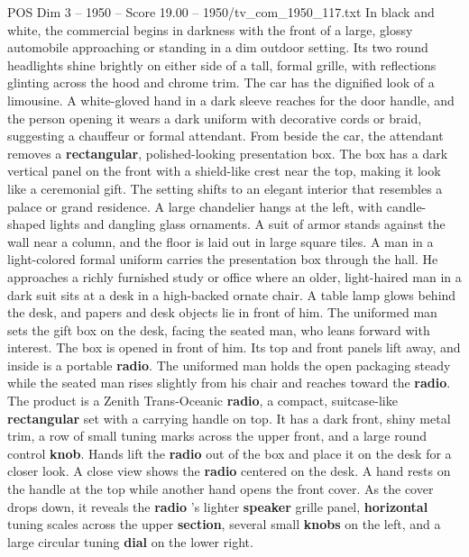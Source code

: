 \begin{textsample}{POS Dim 3 – 1950 – Score 19.00 – 1950/tv\_com\_1950\_117.txt}  \label{ex:f3_pos_003}
In black and white, the commercial begins in darkness with the front of a large, glossy automobile approaching or standing in a dim outdoor setting.
Its two round headlights shine brightly on either side of a tall, formal grille, with reflections glinting across the hood and chrome trim.
The car has the dignified look of a limousine.
A white-gloved hand in a dark sleeve reaches for the door handle, and the person opening it wears a dark uniform with decorative cords or braid, suggesting a chauffeur or formal attendant.
From beside the car, the attendant removes a \textbf{rectangular}, polished-looking presentation box.
The box has a dark vertical panel on the front with a shield-like crest near the top, making it look like a ceremonial gift.
The setting shifts to an elegant interior that resembles a palace or grand residence.
A large chandelier hangs at the left, with candle-shaped lights and dangling glass ornaments.
A suit of armor stands against the wall near a column, and the floor is laid out in large square tiles.
A man in a light-colored formal uniform carries the presentation box through the hall.
He approaches a richly furnished study or office where an older, light-haired man in a dark suit sits at a desk in a high-backed ornate chair.
A table lamp glows behind the desk, and papers and desk objects lie in front of him.
The uniformed man sets the gift box on the desk, facing the seated man, who leans forward with interest.
The box is opened in front of him.
Its top and front panels lift away, and inside is a portable \textbf{radio}.
The uniformed man holds the open packaging steady while the seated man rises slightly from his chair and reaches toward the \textbf{radio}.
The product is a Zenith Trans-Oceanic \textbf{radio}, a compact, suitcase-like \textbf{rectangular} set with a carrying handle on top.
It has a dark front, shiny metal trim, a row of small tuning marks across the upper front, and a large round control \textbf{knob}.
Hands lift the \textbf{radio} out of the box and place it on the desk for a closer look.
A close view shows the \textbf{radio} centered on the desk.
A hand rests on the handle at the top while another hand opens the front cover.
As the cover drops down, it reveals the \textbf{radio} ’s lighter \textbf{speaker} grille panel, \textbf{horizontal} tuning scales across the upper \textbf{section}, several small \textbf{knobs} on the left, and a large circular tuning \textbf{dial} on the lower right.

\end{textsample}

